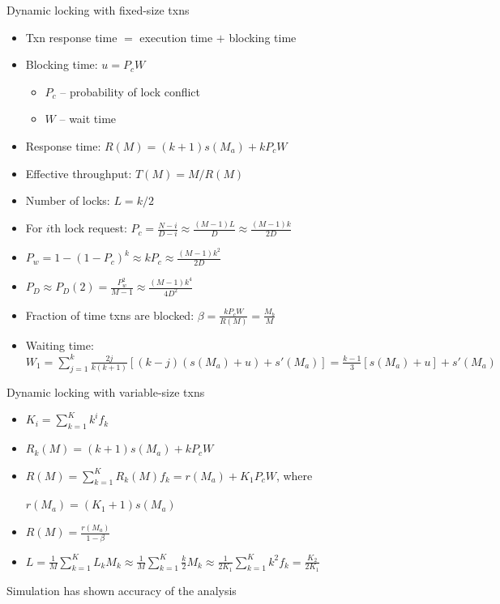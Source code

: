 \documentclass[sans]{beamer}
\begin{document}
\begin{frame}{Dynamic locking with fixed-size txns}
  \begin{itemize}
    \item Txn response time $=$ execution time $+$ blocking time
    \item Blocking time: $u = P_c W$
    \begin{itemize}
      \item $P_c$ -- probability of lock conflict
      \item $W$ -- wait time
    \end{itemize}
  \item Response time: $R(M) = (k + 1) s(M_a) + k P_c W$ 
  \item Effective throughput: $T(M) = M / R(M)$
  \item Number of locks: $L = k / 2$
  \item For $i$th lock request: $P_c = \frac{N - i}{D - i} \approx \frac{(M - 1) L}{D}
    \approx \frac{(M - 1) k}{2D}$
  \item $P_w = 1 - (1 - P_c)^k \approx k P_c \approx \frac{(M - 1) k ^2}{2D}$
  \item $P_D \approx P_D(2) = \frac{P_w^2}{M - 1} \approx \frac{(M - 1)k^4}{4D^2}  $
  \item Fraction of time txns are blocked: $\beta = \frac{k P_c W}{R(M)} = \frac{M_b}{M}$
  \item Waiting time: $W_1 = \sum_{j = 1}^{k}
    \frac{2j}{k(k + 1)} [(k - j)(s(M_a) + u) + s'(M_a)] = \frac{k-1}{3}[s(M_a) + u] + s'(M_a)$
  \end{itemize}
\end{frame}


\newcommand{\sk}{\sum_{k = 1}^{K}}

\begin{frame}{Dynamic locking with variable-size txns}
  \begin{itemize}
    \item $K_i = \sum_{k = 1}^{K} k^i f_k$
    \item $R_k(M) = (k + 1) s(M_a) + kP_cW$
    \item $R(M) = \sum_{k = 1}^{K} R_k(M) f_k = r(M_a) + K_1P_cW$, where

      $r(M_a) = (K_1 + 1) s(M_a)$
    \item $R(M) = \frac{r(M_a)}{1 - \beta}$
    \item $L = \frac{1}{M} \sk L_k M_k \approx \frac{1}{M} \sk \frac{k}{2} M_k
      \approx \frac{1}{2K_1}\sk k^2 f_k = \frac{K_2}{2K_1}$
  \end{itemize}

  \vfill
  Simulation has shown accuracy of the analysis
\end{frame}
\end{document}
